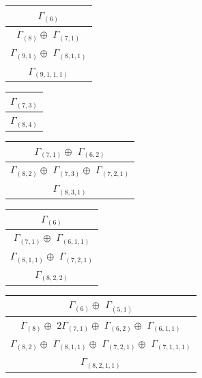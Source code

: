 \documentclass[main.tex]{subfiles}
\begin{document}
\begin{minipage}{.2\textwidth}
\centering
\begin{tabular}{c}
$\Gamma_{(
6
)}$
\\ \hline
$\Gamma_{(
8
)} \oplus$
$\Gamma_{(
7 , 
1
)}$
\\ \hline
$\Gamma_{(
9 , 
1
)} \oplus$
$\Gamma_{(
8 , 
1 , 
1
)}$
\\ \hline
$\Gamma_{(
9 , 
1 , 
1 , 
1
)}$
\\
\end{tabular}\end{minipage}
\begin{minipage}{.2\textwidth}
\centering
\begin{tabular}{c}
$\Gamma_{(
7 , 
3
)}$
\\ \hline
$\Gamma_{(
8 , 
4
)}$
\\
\end{tabular}\end{minipage}
\begin{minipage}{.3\textwidth}
\centering
\begin{tabular}{c}
$\Gamma_{(
7 , 
1
)} \oplus$
$\Gamma_{(
6 , 
2
)}$
\\ \hline
$\Gamma_{(
8 , 
2
)} \oplus$
$\Gamma_{(
7 , 
3
)} \oplus$
$\Gamma_{(
7 , 
2 , 
1
)}$
\\ \hline
$\Gamma_{(
8 , 
3 , 
1
)}$
\\
\end{tabular}\end{minipage}
\bigskip
\begin{minipage}{.2\textwidth}
\centering
\begin{tabular}{c}
$\Gamma_{(
6
)}$
\\ \hline
$\Gamma_{(
7 , 
1
)} \oplus$
$\Gamma_{(
6 , 
1 , 
1
)}$
\\ \hline
$\Gamma_{(
8 , 
1 , 
1
)} \oplus$
$\Gamma_{(
7 , 
2 , 
1
)}$
\\ \hline
$\Gamma_{(
8 , 
2 , 
2
)}$
\\
\end{tabular}\end{minipage}
\begin{minipage}{.4\textwidth}
\centering
\begin{tabular}{c}
$\Gamma_{(
6
)} \oplus$
$\Gamma_{(
5 , 
1
)}$
\\ \hline
$\Gamma_{(
8
)} \oplus$
$ 2 \Gamma_{(
7 , 
1
)} \oplus$
$\Gamma_{(
6 , 
2
)} \oplus$
$\Gamma_{(
6 , 
1 , 
1
)}$
\\ \hline
$\Gamma_{(
8 , 
2
)} \oplus$
$\Gamma_{(
8 , 
1 , 
1
)} \oplus$
$\Gamma_{(
7 , 
2 , 
1
)} \oplus$
$\Gamma_{(
7 , 
1 , 
1 , 
1
)}$
\\ \hline
$\Gamma_{(
8 , 
2 , 
1 , 
1
)}$
\\
\end{tabular}\end{minipage}
\end{document}
